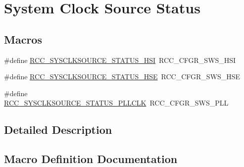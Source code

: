 \hypertarget{group___r_c_c___system___clock___source___status}{}\section{System Clock Source Status}
\label{group___r_c_c___system___clock___source___status}
\subsection*{Macros}
\begin{DoxyCompactItemize}
\item 
\#define \hyperlink{group___r_c_c___system___clock___source___status_ga0d6c2b0b2d59e6591295649853bb2abd}{R\+C\+C\+\_\+\+S\+Y\+S\+C\+L\+K\+S\+O\+U\+R\+C\+E\+\_\+\+S\+T\+A\+T\+U\+S\+\_\+\+H\+SI}~R\+C\+C\+\_\+\+C\+F\+G\+R\+\_\+\+S\+W\+S\+\_\+\+H\+SI
\item 
\#define \hyperlink{group___r_c_c___system___clock___source___status_ga3847769265bf19becf7b976a7e908a64}{R\+C\+C\+\_\+\+S\+Y\+S\+C\+L\+K\+S\+O\+U\+R\+C\+E\+\_\+\+S\+T\+A\+T\+U\+S\+\_\+\+H\+SE}~R\+C\+C\+\_\+\+C\+F\+G\+R\+\_\+\+S\+W\+S\+\_\+\+H\+SE
\item 
\#define \hyperlink{group___r_c_c___system___clock___source___status_ga4f05019ec09da478d084f44dbaad7d6d}{R\+C\+C\+\_\+\+S\+Y\+S\+C\+L\+K\+S\+O\+U\+R\+C\+E\+\_\+\+S\+T\+A\+T\+U\+S\+\_\+\+P\+L\+L\+C\+LK}~R\+C\+C\+\_\+\+C\+F\+G\+R\+\_\+\+S\+W\+S\+\_\+\+P\+LL
\end{DoxyCompactItemize}


\subsection{Detailed Description}


\subsection{Macro Definition Documentation}
\mbox{\label{group___r_c_c___system___clock___source___status_ga3847769265bf19becf7b976a7e908a64}} 
